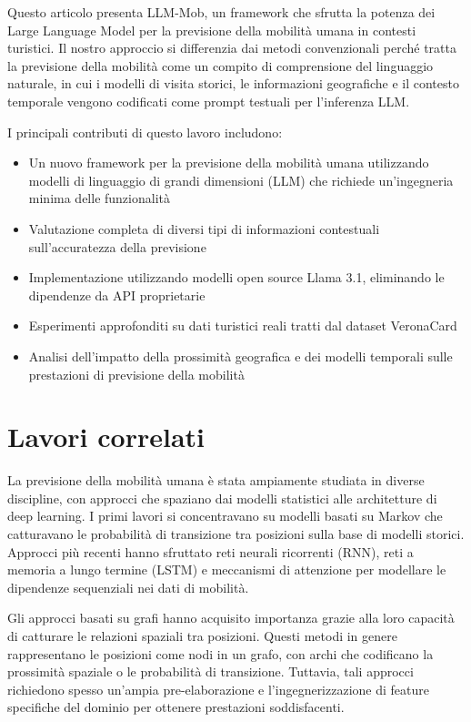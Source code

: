 \documentclass[12pt,a4paper]{article}
\begin{document}
Questo articolo presenta LLM-Mob, un framework che sfrutta la potenza dei Large Language Model per la previsione della mobilità umana in contesti turistici. Il nostro approccio si differenzia dai metodi convenzionali perché tratta la previsione della mobilità come un compito di comprensione del linguaggio naturale, in cui i modelli di visita storici, le informazioni geografiche e il contesto temporale vengono codificati come prompt testuali per l'inferenza LLM.

I principali contributi di questo lavoro includono:

\begin{itemize}
\item Un nuovo framework per la previsione della mobilità umana utilizzando modelli di linguaggio di grandi dimensioni (LLM) che richiede un'ingegneria minima delle funzionalità
\item Valutazione completa di diversi tipi di informazioni contestuali sull'accuratezza della previsione
\item Implementazione utilizzando modelli open source Llama 3.1, eliminando le dipendenze da API proprietarie
\item Esperimenti approfonditi su dati turistici reali tratti dal dataset VeronaCard
\item Analisi dell'impatto della prossimità geografica e dei modelli temporali sulle prestazioni di previsione della mobilità
\end{itemize}


\newpage

\section{Lavori correlati}

La previsione della mobilità umana è stata ampiamente studiata in diverse discipline, con approcci che spaziano dai modelli statistici alle architetture di deep learning. I primi lavori si concentravano su modelli basati su Markov che catturavano le probabilità di transizione tra posizioni sulla base di modelli storici. Approcci più recenti hanno sfruttato reti neurali ricorrenti (RNN), reti a memoria a lungo termine (LSTM) e meccanismi di attenzione per modellare le dipendenze sequenziali nei dati di mobilità.

Gli approcci basati su grafi hanno acquisito importanza grazie alla loro capacità di catturare le relazioni spaziali tra posizioni. Questi metodi in genere rappresentano le posizioni come nodi in un grafo, con archi che codificano la prossimità spaziale o le probabilità di transizione. Tuttavia, tali approcci richiedono spesso un'ampia pre-elaborazione e l'ingegnerizzazione di feature specifiche del dominio per ottenere prestazioni soddisfacenti.
\end{document}
